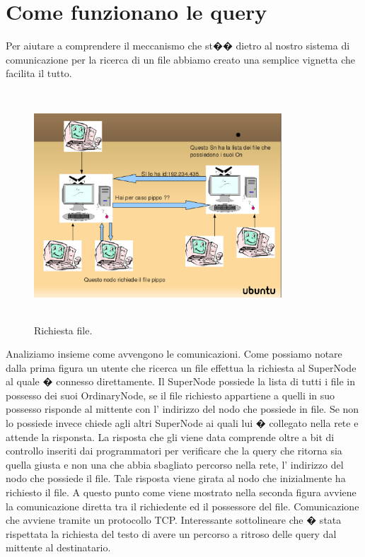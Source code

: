 \section{Come funzionano le query}\label{sec:risposte_vuote}
Per aiutare a comprendere il meccanismo che st�� dietro al nostro sistema di comunicazione per la ricerca di un file abbiamo creato una semplice vignetta che facilita il tutto.
\begin{figure}[t]
 \centering
 \includegraphics[width=350px,height=325px]{images/pippo.eps}
 \caption{Richiesta file.}
 \label{fig:richiesta_file}
\end{figure}
Analiziamo insieme come avvengono le comunicazioni.
Come possiamo notare dalla prima figura un utente che ricerca un file effettua la richiesta al SuperNode al quale � connesso direttamente. 
Il SuperNode possiede la lista di tutti i file in possesso dei suoi OrdinaryNode, se il file richiesto appartiene a quelli in suo possesso risponde al mittente con l' indirizzo del nodo che possiede in file.
Se non lo possiede invece chiede agli altri SuperNode ai quali lui � collegato nella rete e attende la risponsta.
La risposta che gli viene data comprende oltre a bit di controllo inseriti dai programmatori per verificare che la query che ritorna sia quella giusta e non una che abbia sbagliato percorso nella rete, l' indirizzo del nodo che possiede il file. Tale risposta viene girata al nodo che inizialmente ha richiesto il file.
A questo punto come viene mostrato nella seconda figura avviene la comunicazione diretta tra il richiedente ed il possessore del file. Comunicazione che avviene tramite un protocollo TCP.
Interessante sottolineare che � stata rispettata la richiesta del testo di avere un percorso a ritroso delle query dal mittente al destinatario.
